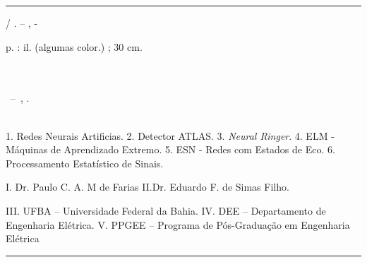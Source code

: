 %
%     
\begin{fichacatalografica}
	\vspace*{\fill}					%
	\hrule							%
	\begin{center}					%
	\begin{minipage}[c]{12.5cm}		%
	
	\imprimirautor
	
	\hspace{0.5cm} \imprimirtitulo  / \imprimirautor. --
	\imprimirlocal, \imprimirdata-
	
	\hspace{0.5cm} \pageref{LastPage} p. : il. (algumas color.) ; 30 cm.\\
	
	\hspace{0.5cm} \imprimirorientadorRotulo~\imprimirorientador\\


	\hspace{0.5cm} \imprimircoorientadorRotulo~\imprimircoorientador\\
	
	\hspace{0.5cm}
	\parbox[t]{\textwidth}{\imprimirtipotrabalho~--~\imprimirinstituicao,
	\imprimirdata.}\\
	
	\hspace{0.5cm}
		1. Redes Neurais Artificias.
		2. Detector ATLAS.
		3. \textit{Neural Ringer}.
		4. ELM - Máquinas de Aprendizado Extremo.
		5. ESN - Redes com Estados de Eco.
		6. Processamento Estatístico de Sinais.

		
		I. Dr. Paulo C. A. M de Farias
		II.Dr. Eduardo F. de Simas Filho.

		III. UFBA -- Universidade Federal da Bahia.
		IV. DEE -- Departamento de Engenharia Elétrica.
		V. PPGEE -- Programa de Pós-Graduação em Engenharia Elétrica\\ 			
	
	
	\end{minipage}
	\end{center}
	\hrule
\end{fichacatalografica}
